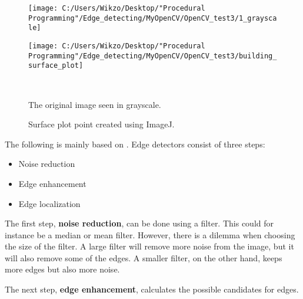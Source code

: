 \begin{figure}[htbp]\centering
	\begin{minipage}[b]{0.48\textwidth}\centering
		\texttt{[image: C:/Users/Wikzo/Desktop/"Procedural Programming"/Edge\_detecting/MyOpenCV/OpenCV\_test3/1\_grayscale]} %
	\end{minipage}\hfill
	\begin{minipage}[b]{0.48\textwidth}\centering
		\texttt{[image: C:/Users/Wikzo/Desktop/"Procedural Programming"/Edge\_detecting/MyOpenCV/OpenCV\_test3/building\_surface\_plot]} %
	\end{minipage}\\ %
	\begin{minipage}[t]{0.48\textwidth}
		\caption{The original image seen in grayscale.} %
		\label{building_gray}
	\end{minipage}\hfill
	\begin{minipage}[t]{0.48\textwidth}
		\caption{Surface plot point created using ImageJ.} %
		\label{surface_plot}
	\end{minipage}
\end{figure}

The following is mainly based on \citep{edge_lecture}.
Edge detectors consist of three steps:
\begin{itemize}
\item Noise reduction
\item Edge enhancement
\item Edge localization
\end{itemize}

The first step, \textbf{noise reduction}, can be done using a filter. This could for instance be a median or mean filter. However, there is a dilemma when choosing the size of the filter. A large filter will remove more noise from the image, but it will also remove some of the edges. A smaller filter, on the other hand, keeps more edges but also more noise.

The next step, \textbf{edge enhancement}, calculates the possible candidates for edges.